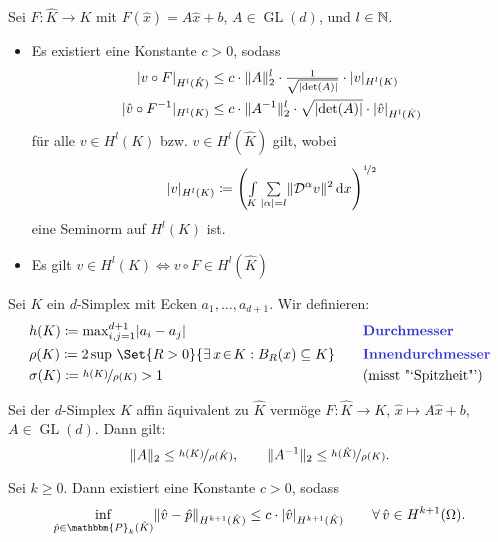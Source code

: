 \documentclass{cheat-sheet}
\newcommand{\DO}{\mathcal{D}} %
\DeclareMathOperator{\GL}{GL}
\newcommand{\Poly}{\mathbbm{P}} %
\begin{document}
\begin{lem}
  Sei $F : \hat{K} \to K$ mit $F(\hat{x}) = A \hat{x} + b$, $A \in \GL(d)$, und $l \in \mathbb{N}$.
  \begin{itemize}
    \item Es existiert eine Konstante $c > 0$, sodass
    \begin{align*}
      \lvert v \circ F\rvert_{H^l(\hat{K})} & \leq c \cdot \lVert A\rVert_2^l \cdot \tfrac{1}{\sqrt{\lvert\det(A)\rvert}} \cdot \lvert v\rvert_{H^l(K)} \\
      \lvert\hat{v} \circ F^{-1}\rvert_{H^l(K)} & \leq c \cdot \lVert A^{-1}\rVert_2^l \cdot \sqrt{\lvert\det(A)\rvert} \cdot \lvert\hat{v}\rvert_{H^l(\hat{K})}
    \end{align*}
    für alle $v \in H^l(K)$ bzw. $\hat{v} \in H^l(\hat{K})$ gilt, wobei
    \[
      \abs{v}_{H^l(K)} \coloneqq \left( \Int{K}{}{\sum_{\abs{\alpha} = l} \norm{\DO^\alpha v}^2} {x}\right)^{\nicefrac{1}{2}}
    \]
    eine Seminorm auf $H^l(K)$ ist.
    \item Es gilt \enspace
    $v \in H^l(K) \iff v \circ F \in H^l(\hat{K})$
  \end{itemize}
\end{lem}


\begin{defn}
  Sei $K$ ein $d$-Simplex mit Ecken $a_1, \ldots, a_{d+1}$.
  Wir definieren:
  \begin{alignat*}{3}
    & h(K) \coloneqq {\max}_{i,j=1}^{d+1} \abs{a_i - a_j} &&
    \text{\emph{Durchmesser}} \\
    & \rho(K) \coloneqq 2 \sup \, \Set{R > 0}{\ex{x \!\in\! K\!}\! B_R(x) \subseteq K} \quad &&
    \text{\emph{Innendurchmesser}} \\
    & \sigma(K) \coloneqq \nicefrac{h(K)}{\rho(K)} > 1 &&
    \text{(misst "`Spitzheit"')}
  \end{alignat*}
\end{defn}

\begin{lem}
  Sei der $d$-Simplex $K$ affin äquivalent zu $\hat{K}$ vermöge $F : \hat{K} \to K$, \enspace $\hat{x} \mapsto A \hat{x} + b$, $A \in \GL(d)$.
  Dann gilt:
  \[
    \lVert A\rVert_2 \leq \nicefrac{h(K)}{\rho(\hat{K})}, \qquad
    \lVert A^{-1}\rVert_2 \leq \nicefrac{h(\hat{K})}{\rho(K)}.
  \]
\end{lem}

\begin{lem}
  Sei $k \geq 0$.
  Dann existiert eine Konstante $c > 0$, sodass
  \[
    \inf_{\hat{p} \in \Poly_k(\hat{K})} \norm{\hat{v} - \hat{p}}_{H^{k+1}(\hat{K})} \leq c \cdot \abs{\hat{v}}_{H^{k+1}(\hat{K})} \qquad
    \forall \, \hat{v} \in H^{k+1}(\Omega).
  \]
\end{lem}
\end{document}
